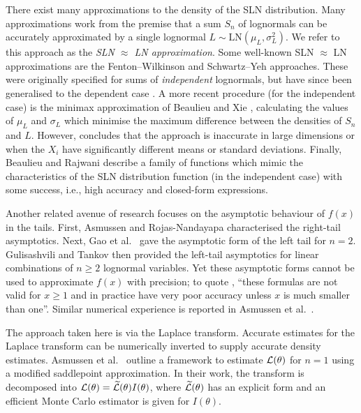 There exist many approximations to the density of the SLN distribution. Many
approximations work from the premise \cite{beaulieu2004highly} that a sum
$S_n$ of lognormals can be accurately approximated by a single lognormal
$L\sim \mathrm{LN}(\mu_L, \sigma_L^2)$. We refer to this approach as the
\emph{SLN $\approx$ LN approximation}. Some well-known SLN $\approx$ LN
approximations are the Fenton--Wilkinson \cite{fenton1960sum} and
Schwartz--Yeh \cite{schwartz1982distribution} approaches. These were
originally specified for sums of \emph{independent} lognormals, but have since
been generalised to the dependent case \cite{abu1994outage}. A more recent
procedure (for the independent case) is the minimax approximation of Beaulieu
and Xie \cite{beaulieu2004optimal}, calculating the values of $\mu_L$ and
$\sigma_L$ which minimise the maximum difference between the densities of
$S_n$ and $L$.  However, \cite{beaulieu2004optimal} concludes that the
approach is inaccurate in large dimensions or when the $X_i$ have
significantly different means or standard deviations. Finally, Beaulieu and
Rajwani \cite{beaulieu2004highly} describe a family of functions which mimic
the characteristics of the SLN distribution function (in the independent case)
with some success, i.e., high accuracy and closed-form expressions.

Another related avenue of research focuses on the asymptotic behaviour of
$f(x)$ in the tails. First, Asmussen and Rojas-Nandayapa
\cite{asmussen2008asymptotics} characterised the right-tail asymptotics. Next,
Gao et al.\ \cite{gao2009asymptotic} gave the asymptotic form of the left tail
for $n=2$. Gulisashvili and Tankov \cite{tankov2015tail} then provided the
left-tail asymptotics for linear combinations of $n \geq 2$ lognormal
variables. Yet these asymptotic forms cannot be used to approximate $f(x)$
with precision; to quote \cite[p.\ 29]{tankov2015tail}, ``these formulas are
not valid for $x \geq 1$ and in practice have very poor accuracy unless $x$ is
much smaller than one''.  Similar numerical experience is reported in Asmussen
et al.\ \cite{asmussen2015exponential}.

The approach taken here is via the Laplace transform. Accurate estimates for
the Laplace transform can be numerically inverted to supply accurate density
estimates. Asmussen et al.\ \cite{asmussen2014laplace,asmussen2015exponential}
outline a framework to estimate $\mathcal{L}(\theta)$ for $n=1$ using a modified
saddlepoint approximation. In their work, the transform is decomposed into
$\mathcal{L}(\theta)=\widetilde{\mathcal{L}}(\theta)I(\theta)$, where
$\widetilde{\mathcal{L}}(\theta)$ has an explicit form and an efficient Monte
Carlo estimator is given for $I(\theta)$.

